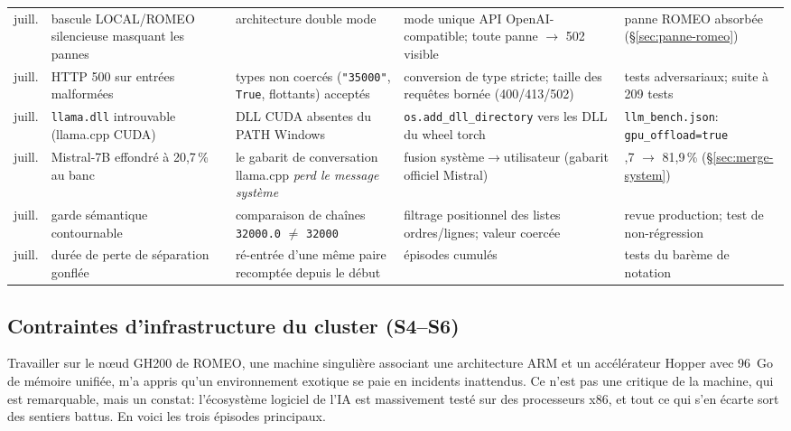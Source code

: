 \documentclass[11pt,a4paper]{article}
\begin{document}
\begin{table}[!htbp]
\begin{tabular}{>{\raggedright\arraybackslash}p{0.9cm} >{\raggedright\arraybackslash}p{3.3cm} >{\raggedright\arraybackslash}p{3.6cm} >{\raggedright\arraybackslash}p{3.6cm} >{\raggedright\arraybackslash}p{2.6cm}}
juill. & bascule LOCAL/ROMEO silencieuse masquant les pannes & architecture double mode & mode unique API OpenAI-compatible; toute panne $\rightarrow$ 502 visible & panne ROMEO absorbée (\S\ref{sec:panne-romeo})\\
juill. & HTTP 500 sur entrées malformées & types non coercés (\texttt{"35000"}, \texttt{True}, flottants) acceptés & conversion de type stricte; taille des requêtes bornée (400/413/502) & tests adversariaux; suite à 209 tests\\
juill. & \texttt{llama.dll} introuvable (llama.cpp CUDA) & DLL CUDA absentes du PATH Windows & \texttt{os.add\_dll\_directory} vers les DLL du wheel torch & \texttt{llm\_bench.json}: \texttt{gpu\_offload=true}\\
juill. & Mistral-7B effondré à 20,7\,\% au banc & le gabarit de conversation llama.cpp \emph{perd le message système} & fusion système$\rightarrow$utilisateur (gabarit officiel Mistral) & 20,7 $\rightarrow$ 81,9\,\% (\S\ref{sec:merge-system})\\
juill. & garde sémantique contournable & comparaison de chaînes \texttt{32000.0} $\neq$ \texttt{32000} & filtrage positionnel des listes ordres/lignes; valeur coercée & revue production; test de non-régression\\
juill. & durée de perte de séparation gonflée & ré-entrée d'une même paire recomptée depuis le début & épisodes cumulés & tests du barème de notation\\
\bottomrule
\end{tabular}
\end{table}

\subsection{Contraintes d'infrastructure du cluster (S4--S6)}
\label{sec:infra}

Travailler sur le n\oe ud GH200 de ROMEO, une machine singulière associant une architecture ARM et un accélérateur Hopper avec 96~Go de mémoire unifiée, m'a appris qu'un environnement exotique se paie en incidents inattendus. Ce n'est pas une critique de la machine, qui est remarquable, mais un constat: l'écosystème logiciel de l'IA est massivement testé sur des processeurs x86, et tout ce qui s'en écarte sort des sentiers battus. En voici les trois épisodes principaux.
\end{document}
